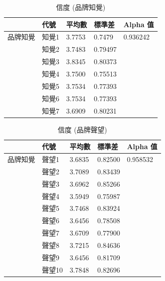 \begin{table}[H]
\caption{信度 (品牌知覺)}
\label{tab:e2}
\renewcommand{\arraystretch}{1.2} %
\arrayrulewidth=1pt               %
\tabcolsep=18pt                   %
\begin{tabular}[t]{lllll}  %
\hline
 & 代號& 平均數 & 標準差&  Alpha 值  \\
\hline
品牌知覺 & 知覺1  & 3.7753   & 0.7479  &0.936242 \\
              & 知覺2  & 3.7483  &0.79497  &  \\
             & 知覺3  & 3.8345    & 0.80373  &  \\
             & 知覺4 & 3.7500   &0.75513  &\\
             & 知覺5   & 3.7534  & 0.77393 &  \\
             & 知覺6  & 3.7534    &  0.77393 & \\
             & 知覺7  & 3.6909     & 0.80231  &  \\
\hline
\end{tabular}
\end{table}


\begin{table}[H]
\caption{信度 (品牌聲望)}
\label{tab:e3}
\renewcommand{\arraystretch}{1.2} %
\arrayrulewidth=1pt               %
\tabcolsep=18pt                   %
\begin{tabular}[t]{lllll}  %
\hline
 & 代號& 平均數 & 標準差&  Alpha 值  \\
\hline
品牌知覺 & 聲望1  & 3.6835 &0.82500 &0.958532\\
              & 聲望2  & 3.7089 &0.83439 &  \\
             & 聲望3  &3.6962 &0.85266  &  \\
             & 聲望4  &3.5949&0.75987\\
             & 聲望5  & 3.7468 &0.83924 &  \\
             & 聲望6  & 3.6456&0.78508& \\
             & 聲望7  & 3.6709&0.77900  &  \\
             & 聲望8  & 3.7215&0.84636&  \\
             & 聲望9  &3.6456&0.81709&  \\
             & 聲望10  & 3.7848&0.82696 &  \\
\hline
\end{tabular}
\end{table}

